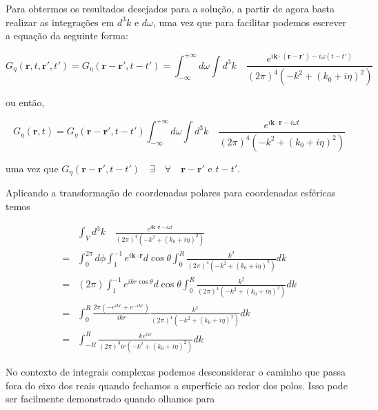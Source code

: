 Para obtermos os resultados desejados para a solução, a partir de agora basta realizar as integrações em $d^3k$ e $d\omega$, uma vez que para facilitar podemos escrever a equação da seguinte forma:

\begin{equation}
	G_{\eta}(\textbf{r},t, \textbf{r}', t') = G_{\eta}(\textbf{r}-\textbf{r}',t-t') = \int_{-\infty}^{+\infty} d\omega \int d^3k \quad  \frac{e^{i\textbf{k}\cdot(\textbf{r}-\textbf{r}')-i\omega (t-t')}}{(2\pi)^4\left( -k^2 + (k_0+i\eta)^2\right)}
\end{equation}

ou então,

\begin{equation}
	G_{\eta}(\textbf{r},t) = G_{\eta}(\textbf{r}-\textbf{r}',t-t') \int_{-\infty}^{+\infty} d\omega \int d^3k \quad  \frac{e^{i\textbf{k}\cdot\textbf{r}-i\omega t}}{(2\pi)^4\left( -k^2 + (k_0+i\eta)^2\right)}
\end{equation}

uma vez que $G_{\eta}(\textbf{r}-\textbf{r}',t-t') \quad \exists \quad \forall \quad \textbf{r}-\textbf{r}' \text{ e } t-t'.$ 

Aplicando a transformação de coordenadas polares para coordenadas esféricas temos

\begin{equation}
	\begin{split}
	& \int_V d^3k \quad  \frac{e^{i\textbf{k}\cdot\textbf{r}-i\omega t}}{(2\pi)^4\left( -k^2 + (k_0+i\eta)^2\right)}\\
	 = &  \int_0^{2\pi}d\phi \int_{1}^{-1} e^{i\textbf{k}\cdot\textbf{r}} d\cos\theta \int_{0}^{R} \frac{k^2}{(2\pi)^4\left( -k^2 + (k_0+i\eta)^2\right)}dk \\
	 = &  (2\pi) \int_{1}^{-1} e^{ikr\cos\theta} d\cos\theta \int_{0}^{R} \frac{k^2}{(2\pi)^4\left( -k^2 + (k_0+i\eta)^2\right)}dk\\
	 = & \int_{0}^{R} \frac{2\pi \left(-e^{ikr}+e^{-ikr}\right)}{ikr} \frac{k^2}{(2\pi)^4\left( -k^2 + (k_0+i\eta)^2\right)}dk\\
	 = & \int_{-R}^{R} \frac{ke^{ikr}}{(2\pi)^3 ir\left( -k^2 + (k_0+i\eta)^2\right)}dk
	\end{split}
\end{equation}

No contexto de integrais complexas podemos desconsiderar o caminho que passa fora do eixo dos reais quando fechamos a superfície ao redor dos polos. Isso pode ser facilmente demonstrado quando olhamos para

